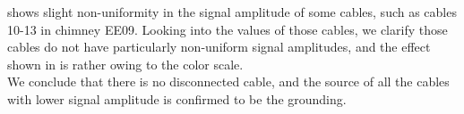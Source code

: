  shows slight non-uniformity
in the signal amplitude of some cables, 
such as cables 10-13 in chimney EE09.
Looking into the values of those cables, we clarify those cables do not
have particularly non-uniform signal amplitudes, and the effect shown
in  is rather owing to the color scale.\\

We conclude that there is no disconnected cable, and the source of all 
the cables with lower signal amplitude is confirmed to be the grounding.


